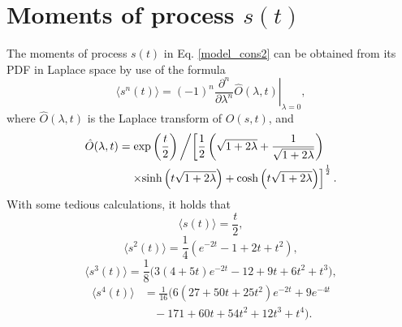 \documentclass[aps,pre,twocolumn,groupedaddress,longbibliography]{revtex4-2}
\begin{document}
\section{Moments of process $s(t)$}\label{App2}
The moments of process $s(t)$ in Eq. \eqref{model_cons2} can be obtained from its PDF in Laplace space by use of the formula
\begin{equation}
  \langle s^n(t)\rangle=(-1)^n\left.\frac{\partial^n}{\partial \lambda^n}\hat{O}(\lambda,t)\right|_{\lambda=0},
\end{equation}
where $\hat{O}(\lambda,t)$ is the Laplace transform of $O(s,t)$, and \cite{Dankel:1991,ChechkinSenoMetzlerSokolov:2017}
\begin{equation}
\begin{split}
    \hat{O}(\lambda,t)&=\exp\left(\frac{t}{2}\right)\left/\left[\frac{1}{2}\left(\sqrt{1+2\lambda}+\frac{1}{\sqrt{1+2\lambda}}\right)\right.\right.\\
&~~~\left.\times\textrm{sinh}\left(t\sqrt{1+2\lambda}\right)
+\textrm{cosh}\left(t\sqrt{1+2\lambda}\right)\right]^{\frac{1}{2}}.
\end{split}
\end{equation}
\vspace{5mm}
With some tedious calculations, it holds that
\begin{equation}
\langle s(t)\rangle=\frac{t}{2},
\end{equation}
\begin{equation*}
\langle s^2(t)\rangle=\frac{1}{4}(e^{-2t}-1+2t+t^2),
\end{equation*}
\begin{equation*}
\langle s^3(t)\rangle=\frac{1}{8}\Big(3(4+5t)e^{-2t}-12+9t+6t^2+t^3\Big),
\end{equation*}
\begin{equation*}
\begin{split}
\langle s^4(t)\rangle&=\frac{1}{16}\Big(6(27+50t+25t^2)e^{-2t}+9e^{-4t} \\[2pt]
   &~~~~-171+60t+54t^2+12t^3+t^4\Big).
\end{split}
\end{equation*}
\end{document}
